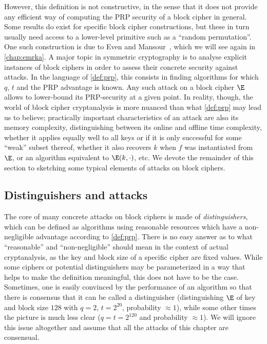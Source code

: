 However, this definition is not constructive, in the sense that it does not provide any efficient
way of computing the PRP security of a block cipher in general. Some results do exist for specific block cipher constructions,
but these in turn usually need access to a lower-level primitive such as a
``random permutation''. One such construction is due to Even and Mansour~\cite{EM}, which we will see again in \autoref{chap:emrka}.
A major topic in symmetric cryptography is to analyse explicit instances of block ciphers
in order to assess their concrete security against attacks. In the language of \autoref{def:prp}, this
consists in finding algorithms for which $q$, $t$ and the PRP advantage is known. Any such attack on a block cipher $\E$ allows to lower-bound its PRP-security at a given point.
In reality, though, the world of block cipher cryptanalysis is more nuanced than what \autoref{def:prp} may lead us to believe; practically important characteristics of an attack
are also its memory complexity, distinguishing between its online and offline time complexity, whether it applies equally well to all keys or if it is only successful
for some ``weak'' subset thereof, whether it also recovers $k$ when $f$ was instantiated from $\E$, or an algorithm equivalent to $\E(k,\cdot)$, etc. We devote the remainder of this
section to sketching some typical elements of attacks on block ciphers.

\subsection{Distinguishers and attacks}
The core of many concrete attacks on block ciphers is made of \emph{distinguishers}, which can be defined as algorithms using reasonable resources which have a non-negligible advantage according to \autoref{def:prp}.
There is no easy answer as to what ``reasonable'' and ``non-negligible'' should mean in the context of actual cryptanalysis, as the key and block size of a specific cipher are fixed values. While some ciphers or potential distinguishers
may be parameterized in a way that helps to make the definition meaningful, this does not have to be the case. Sometimes, one is easily convinced by the performance of an algorithm so that there is
consensus that it can be called a distinguisher (\eg distinguishing $\E$ of key and block size $128$ with $q = 2$, $t = 2^{20}$, probability $\approx 1$), while some other times the picture is much less clear
(\eg $q = t =  2^{120}$ and probability $\approx 1$). We will ignore this issue altogether and assume that all the attacks of this chapter are consensual.


